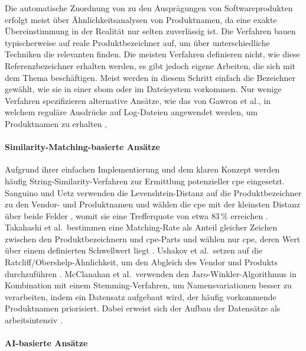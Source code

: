 Die automatische Zuordnung von  zu den Ausprägungen von Softwareprodukten erfolgt meist über Ähnlichkeitsanalysen von Produktnamen, da eine exakte Übereinstimmung in der Realität nur selten zuverlässig ist.
Die Verfahren bauen typischerweise auf reale Produktbezeichner auf, um über unterschiedliche Techniken die relevanten  finden.
Die meisten Verfahren definieren nicht, wie diese Referenzbezeichner erhalten werden, es gibt jedoch eigene Arbeiten, die sich mit dem Thema beschäftigen.
Meist werden in diesem Schritt einfach die Bezeichner gewählt, wie sie in einer \acrshort{sbom} oder im Dateisystem vorkommen.
Nur wenige Verfahren spezifizieren alternative Ansätze, wie das von Gawron et al., in welchem reguläre Ausdrücke auf Log-Dateien angewendet werden, um Produktnamen zu erhalten \autocite{Gawron2017},

\paragraph{Similarity-Matching-basierte Ansätze}

Aufgrund ihrer einfachen Implementierung und dem klaren Konzept werden häufig String-Similarity-Verfahren zur Ermittlung potenzieller \acrshort{cpe} eingesetzt.
Sanguino und Uetz verwenden die Levenshtein-Distanz auf die Produktbezeichner zu den Vendor- und Produktnamen und wählen die \acrshort{cpe} mit der kleinsten Distanz über beide Felder \autocite{Sanguino_Uetz_2017}, womit sie eine Trefferquote von etwa $83\,\%$ erreichen \autocite{Idrissi_Sebai_Faroukhi_Mahouachi_2024}.
Takahashi et al.\ bestimmen eine Matching-Rate als Anteil gleicher Zeichen zwischen den Produktbezeichnern und \acrshort{cpe}-Parts und wählen nur \acrshort{cpe}, deren Wert über einem definierten Schwellwert liegt \autocite{Takahashi_Miyamoto_Nakao_2016}.
Ushakov et al.\ setzen auf die Ratcliff/Obershelp-Ähnlichkeit, um den Abgleich des Vendor und Produkts durchzuführen \autocite{Ushakov_Doynikova_Novikova_Kotenko_2021}.
McClanahan et al.\ verwenden den Jaro-Winkler-Algorithmus in Kombination mit einem Stemming-Verfahren, um Namensvariationen besser zu verarbeiten, indem ein Datensatz aufgebaut wird, der häufig vorkommende Produktnamen priorisiert.
Dabei erweist sich der Aufbau der Datensätze als arbeitsintensiv \autocite{McClanahan_Li_2024}.

\paragraph{AI-basierte Ansätze}

